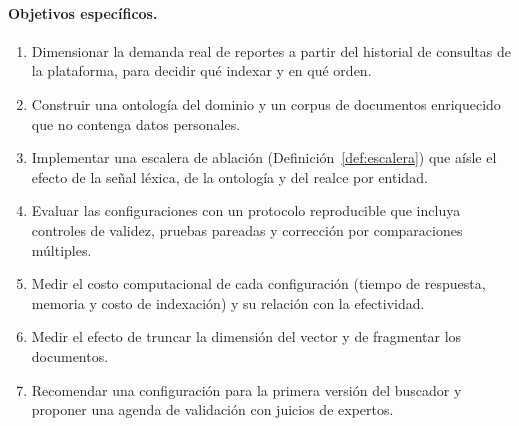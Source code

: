 \documentclass[11pt,letterpaper]{article}
\numberwithin{equation}{section}
\begin{document}
\paragraph{Objetivos específicos.}
\begin{enumerate}[leftmargin=2.2em,itemsep=1pt]
  \item Dimensionar la demanda real de reportes a partir del historial de consultas de la plataforma, para decidir qué indexar y en qué orden.
  \item Construir una ontología del dominio y un corpus de documentos enriquecido que no contenga datos personales.
  \item Implementar una escalera de ablación (Definición~\ref{def:escalera}) que aísle el efecto de la señal léxica, de la ontología y del realce por entidad.
  \item Evaluar las configuraciones con un protocolo reproducible que incluya controles de validez, pruebas pareadas y corrección por comparaciones múltiples.
  \item Medir el costo computacional de cada configuración (tiempo de respuesta, memoria y costo de indexación) y su relación con la efectividad.
  \item Medir el efecto de truncar la dimensión del vector y de fragmentar los documentos.
  \item Recomendar una configuración para la primera versión del buscador y proponer una agenda de validación con juicios de expertos.
\end{enumerate}
\end{document}
